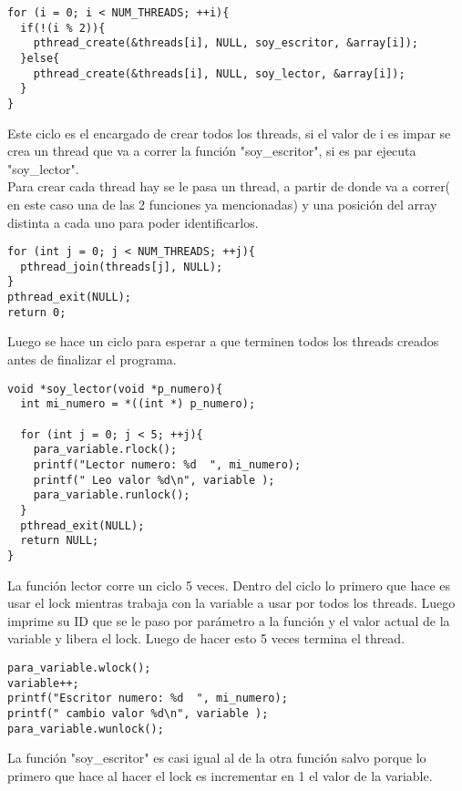 \begin{verbatim}
for (i = 0; i < NUM_THREADS; ++i){
  if(!(i % 2)){
    pthread_create(&threads[i], NULL, soy_escritor, &array[i]);
  }else{
    pthread_create(&threads[i], NULL, soy_lector, &array[i]);
  }
}
\end{verbatim}

Este ciclo es el encargado de crear todos los threads, si el valor de i es impar se crea un thread que va a correr la funci\'{o}n 
"soy\_escritor", si es par ejecuta "soy\_lector". \\
Para crear cada thread hay se le pasa un thread, a partir de donde va a correr( en este caso una de las 2 funciones ya mencionadas) 
y una posici\'{o}n del array distinta a cada uno para poder identificarlos.\\

\begin{verbatim}
for (int j = 0; j < NUM_THREADS; ++j){
  pthread_join(threads[j], NULL);
}
pthread_exit(NULL);
return 0;
\end{verbatim}
Luego se hace un ciclo para esperar a que terminen todos los threads creados antes de finalizar el programa.\\

\begin{verbatim}
void *soy_lector(void *p_numero){
  int mi_numero = *((int *) p_numero);

  for (int j = 0; j < 5; ++j){
    para_variable.rlock();
    printf("Lector numero: %d  ", mi_numero);
    printf(" Leo valor %d\n", variable );
    para_variable.runlock();
  }
  pthread_exit(NULL);
  return NULL;
}
\end{verbatim}

La funci\'{o}n lector corre un ciclo 5 veces. Dentro del ciclo lo primero que hace es usar el lock mientras trabaja con la 
variable a usar por todos los threads. Luego imprime su ID que se le paso por par\'{a}metro a la funci\'{o}n y el valor 
actual de la variable y libera el lock. Luego de hacer esto 5 veces termina el thread.\\


\begin{verbatim}
para_variable.wlock();
variable++;
printf("Escritor numero: %d  ", mi_numero);
printf(" cambio valor %d\n", variable );
para_variable.wunlock();
\end{verbatim}

La funci\'{o}n "soy\_escritor" es casi igual al de la otra funci\'{o}n salvo porque lo primero que hace al hacer el lock es 
incrementar en 1 el valor de la variable.